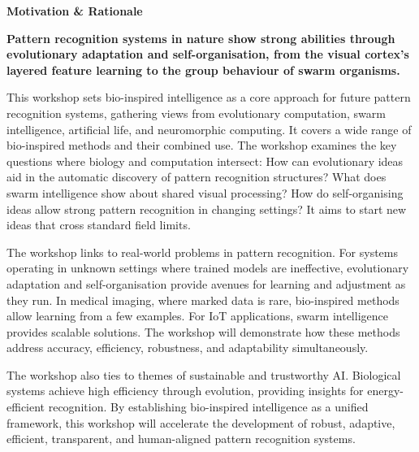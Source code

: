 \documentclass[a4paper,11pt]{article}
\begin{document}
\begin{center}
{\Large \textbf{\color{sage!60!black}Motivation \& Rationale}}
\end{center}
\vspace{0.1cm}
\begin{center}
\parbox{\textwidth}{
\small \color{darktext}

\textbf{Pattern recognition systems in nature show strong abilities through evolutionary adaptation and self-organisation, from the visual cortex's layered feature learning to the group behaviour of swarm organisms.}

This workshop sets bio-inspired intelligence as a core approach for future pattern recognition systems, gathering views from evolutionary computation, swarm intelligence, artificial life, and neuromorphic computing. It covers a wide range of bio-inspired methods and their combined use. The workshop examines the key questions where biology and computation intersect: How can evolutionary ideas aid in the automatic discovery of pattern recognition structures? What does swarm intelligence show about shared visual processing? How do self-organising ideas allow strong pattern recognition in changing settings? It aims to start new ideas that cross standard field limits.

\vspace{0.1cm}
The workshop links to real-world problems in pattern recognition. For systems operating in unknown settings where trained models are ineffective, evolutionary adaptation and self-organisation provide avenues for learning and adjustment as they run. In medical imaging, where marked data is rare, bio-inspired methods allow learning from a few examples. For IoT applications, swarm intelligence provides scalable solutions. The workshop will demonstrate how these methods address accuracy, efficiency, robustness, and adaptability simultaneously.

\vspace{0.1cm}
The workshop also ties to themes of sustainable and trustworthy AI. Biological systems achieve high efficiency through evolution, providing insights for energy-efficient recognition. By establishing bio-inspired intelligence as a unified framework, this workshop will accelerate the development of robust, adaptive, efficient, transparent, and human-aligned pattern recognition systems.
}
\end{center}
\end{document}
